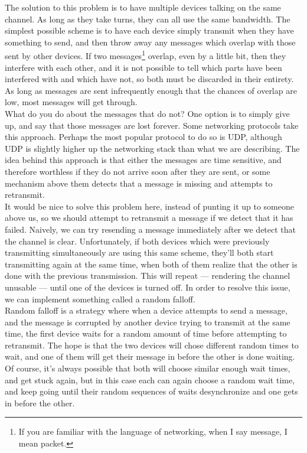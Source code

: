 \documentclass{article}
\begin{document}
The solution to this problem is to have multiple devices talking on the same channel. As long as they take turns, they can all use the same bandwidth. The simplest possible scheme is to have each device simply transmit when they have something to send, and then throw away any messages which overlap with those sent by other devices. If two messages\footnote{If you are familiar with the language of networking, when I say message, I mean packet.} overlap, even by a little bit, then they interfere with each other, and it is not possible to tell which parts have been interfered with and which have not, so both must be discarded in their entirety. As long as messages are sent infrequently enough that the chances of overlap are low, most messages will get through.\\

What do you do about the messages that do not? One option is to simply give up, and say that those messages are lost forever. Some networking protocols take this approach. Perhaps the most popular protocol to do so is UDP, although UDP is slightly higher up the networking stack than what we are describing. The idea behind this approach is that either the messages are time sensitive, and therefore worthless if they do not arrive soon after they are sent, or some mechanism above them detects that a message is missing and attempts to retransmit.\\

It would be nice to solve this problem here, instead of punting it up to someone above us, so we should attempt to retransmit a message if we detect that it has failed. Naively, we can try resending a message immediately after we detect that the channel is clear. Unfortunately, if both devices which were previously transmitting simultaneously are using this same scheme, they'll both start transmitting again at the same time, when both of them realize that the other is done with the previous transmission. This will repeat --- rendering the channel unusable --- until one of the devices is turned off. In order to resolve this issue, we can implement something called a random falloff.\\

Random falloff is a strategy where when a device attempts to send a message, and the message is corrupted by another device trying to transmit at the same time, the first device waits for a random amount of time before attempting to retransmit. The hope is that the two devices will chose different random times to wait, and one of them will get their message in before the other is done waiting. Of course, it's always possible that both will choose similar enough wait times, and get stuck again, but in this case each can again choose a random wait time, and keep going until their random sequences of waits desynchronize and one gets in before the other.\\
\end{document}
